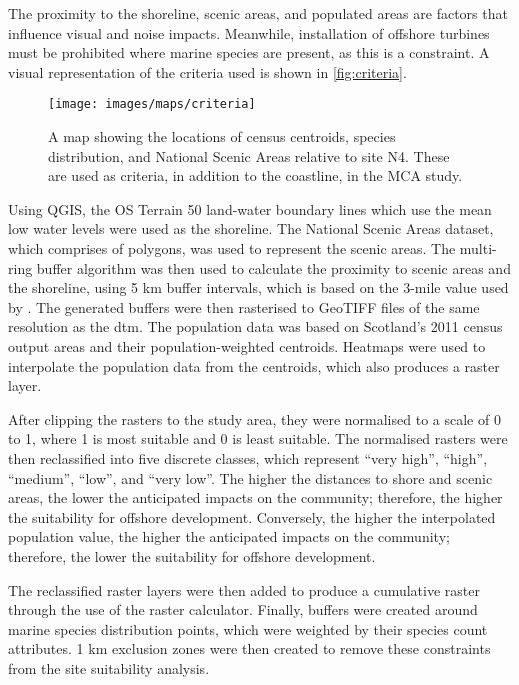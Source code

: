 The proximity to the shoreline, scenic areas, and populated areas are factors
that influence visual and noise impacts. Meanwhile, installation of offshore
turbines must be prohibited where marine species are present, as this is a
constraint. A visual representation of the criteria used is shown in
\autoref{fig:criteria}.

\begin{figure}
  \centering
  \texttt{[image: images/maps/criteria]}
\caption{A map showing the locations of census centroids, species
distribution, and National Scenic Areas relative to site N4. These are used as
criteria, in addition to the coastline, in the MCA study. \label{fig:criteria}}
\end{figure}

Using QGIS, the OS Terrain 50 land-water boundary lines which use the mean low
water levels were used as the shoreline. The National Scenic Areas dataset,
which comprises of polygons, was used to represent the scenic areas. The
multi-ring buffer algorithm was then used to calculate the proximity to scenic
areas and the shoreline, using 5 km buffer intervals, which is based on the
3-mile value used by \textcite{mekonnen2015}. The generated buffers were then
rasterised to GeoTIFF files of the same resolution as the \gls{dtm}. The
population data was based on Scotland's 2011 census output areas and their
population-weighted centroids. Heatmaps were used to interpolate the population
data from the centroids, which also produces a raster layer.

After clipping the rasters to the study area, they were normalised to a scale
of 0 to 1, where 1 is most suitable and 0 is least suitable. The normalised
rasters were then reclassified into five discrete classes, which represent
``very high'', ``high'', ``medium'', ``low'', and ``very low''. The higher the
distances to shore and scenic areas, the lower the anticipated impacts on the
community; therefore, the higher the suitability for offshore development.
Conversely, the higher the interpolated population value, the higher the
anticipated impacts on the community; therefore, the lower the suitability for
offshore development.

The reclassified raster layers were then added to produce a cumulative raster
through the use of the raster calculator. Finally, buffers were created around
marine species distribution points, which were weighted by their species count
attributes. 1 km exclusion zones were then created to remove these constraints
from the site suitability analysis.

